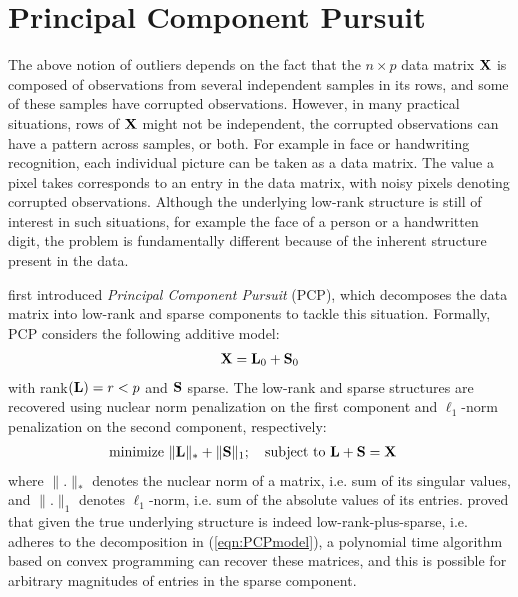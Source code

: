 \section{Principal Component Pursuit}
\label{section:sec3}

The above notion of outliers depends on the fact that the $n \times p$ data matrix ${\mathbf{X}}$ is composed of observations from several independent samples in its rows, and some of these samples have corrupted observations. However, in many practical situations, rows of ${\mathbf{X}}$ might not be independent, the corrupted observations can have a pattern across samples, or both. For example in face or handwriting recognition, each individual picture can be taken as a data matrix. The value a pixel takes corresponds to an entry in the data matrix, with noisy pixels denoting corrupted observations. Although the underlying low-rank structure is still of interest in such situations, for example the face of a person or a handwritten digit, the problem is fundamentally different because of the inherent structure present in the data.

\cite{CandesEtal09} first introduced {\it Principal Component Pursuit} (PCP), which decomposes the data matrix into low-rank and sparse components to tackle this situation. Formally, PCP considers the following additive model:
%
\begin{align}\label{eqn:PCPmodel}
{\mathbf{X}} = {\mathbf{L}}_0 + {\mathbf{S}}_0
\end{align}
%
with rank$({\mathbf{L}}) = r < p$ and ${\mathbf{S}}$ sparse. The low-rank and sparse structures are recovered using nuclear norm penalization on the first component and $\ell_1$-norm penalization on the second component, respectively:
%
\begin{align}
& \text{minimize } \| {\mathbf{L}} \|_* + \| {\mathbf{S}} \|_1; \quad \text{subject to } {\mathbf{L}} + {\mathbf{S}} = {\mathbf{X}}
\end{align}
%
where $\|.\|_*$ denotes the nuclear norm of a matrix, i.e. sum of its singular values, and $\|.\|_1$ denotes $\ell_1$-norm, i.e. sum of the absolute values of its entries. \cite{CandesEtal09} proved that given the true underlying structure is indeed low-rank-plus-sparse, i.e. adheres to the decomposition in (\ref{eqn:PCPmodel}), a polynomial time algorithm based on convex programming can recover these matrices, and this is possible for arbitrary magnitudes of entries in the sparse component.